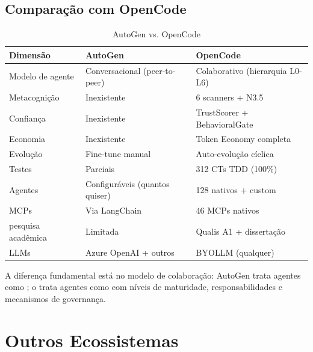 \subsection{Comparação com OpenCode}
\begin{table}[htb]
\centering
\caption{AutoGen vs. OpenCode}
\label{tab:comparacao-autogen}
\begin{tabular}{lll}
\toprule
\textbf{Dimensão} & \textbf{AutoGen} & \textbf{OpenCode} \\
\midrule
Modelo de agente & Conversacional (peer-to-peer) & Colaborativo (hierarquia L0-L6) \\
Metacognição & Inexistente & 6 scanners + N3.5 \\
Confiança & Inexistente & TrustScorer + BehavioralGate \\
Economia & Inexistente & Token Economy completa \\
Evolução & Fine-tune manual & Auto-evolução cíclica \\
Testes & Parciais & 312 CTs TDD (100\%) \\
Agentes & Configuráveis (quantos quiser) & 128 nativos + custom \\
MCPs & Via LangChain & 46 MCPs nativos \\
pesquisa acadêmica & Limitada & Qualis A1 + dissertação \\
LLMs & Azure OpenAI + outros & BYOLLM (qualquer) \\
\bottomrule
\end{tabular}
\end{table}
\noindent A diferença fundamental está no modelo de colaboração:
AutoGen trata agentes como ;
o \opencodeeco{} trata agentes como  com níveis de maturidade, responsabilidades e
mecanismos de governança.
\section{Outros Ecossistemas}
\label{sec:outros}
\nivelbasico
